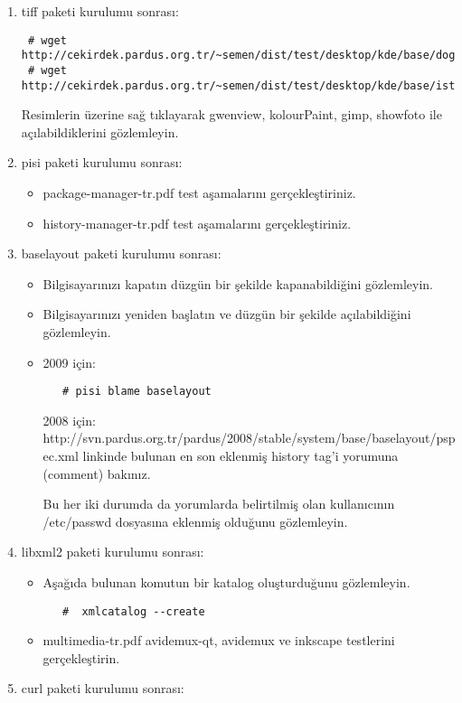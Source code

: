 \documentclass[a4paper,10pt]{article}
\begin{document}
\begin{enumerate}
\begin{itemize}
\end{itemize}
\item tiff paketi kurulumu sonrası:
\begin{verbatim}
 # wget http://cekirdek.pardus.org.tr/~semen/dist/test/desktop/kde/base/doga.tiff
 # wget http://cekirdek.pardus.org.tr/~semen/dist/test/desktop/kde/base/istanbul.tiff
\end{verbatim}

Resimlerin üzerine sağ tıklayarak gwenview, kolourPaint, gimp, showfoto ile açılabildiklerini gözlemleyin.
\item pisi paketi kurulumu sonrası:
\begin{itemize}
 \item package-manager-tr.pdf test aşamalarını gerçekleştiriniz.
 \item history-manager-tr.pdf test aşamalarını gerçekleştiriniz.
\end{itemize}
\item baselayout paketi kurulumu sonrası:
\begin{itemize}
 \item Bilgisayarınızı kapatın düzgün bir şekilde kapanabildiğini gözlemleyin.
 \item Bilgisayarınızı yeniden başlatın ve düzgün bir şekilde açılabildiğini gözlemleyin.
 \item 2009 için:
  \begin{verbatim}
   # pisi blame baselayout
  \end{verbatim}
      2008 için: http://svn.pardus.org.tr/pardus/2008/stable/system/base/baselayout/pspec.xml linkinde bulunan en son eklenmiş history tag'i yorumuna (comment) bakınız.

   Bu her iki durumda da yorumlarda belirtilmiş olan kullanıcının /etc/passwd dosyasına eklenmiş olduğunu gözlemleyin.

\end{itemize}
\item libxml2 paketi kurulumu sonrası:

\begin{itemize}
\item Aşağıda bulunan komutun bir katalog oluşturduğunu gözlemleyin.
  \begin{verbatim}
   #  xmlcatalog --create
  \end{verbatim}
\item multimedia-tr.pdf avidemux-qt, avidemux ve inkscape testlerini gerçekleştirin.
\end{itemize}
\item curl paketi kurulumu sonrası:


\end{enumerate}
\end{document}
